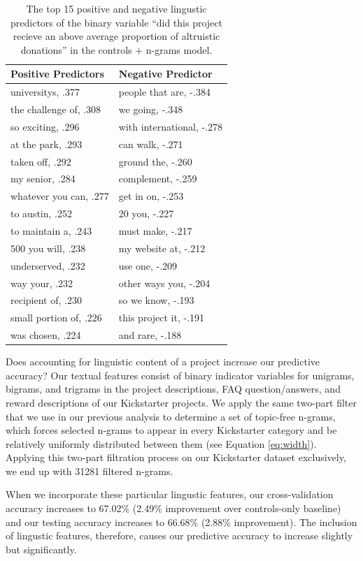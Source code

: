 \documentclass[letterpaper]{article}
\begin{document}
\begin{table}[t]
\centering
\begin{tabular}{|l|l|}
\hline
Positive Predictors & Negative Predictor \\
\hline
universitys, .377 & people that are, -.384 \\
the challenge of, .308 & we going, -.348\\
so exciting, .296 & with international, -.278\\
at the park, .293 & can walk, -.271\\
taken off, .292 & ground the, -.260\\
my senior, .284 & complement, -.259\\
whatever you can, .277 & get in on, -.253\\
to austin, .252 & 20 you, -.227\\
to maintain a, .243 & must make, -.217\\
500 you will, .238 & my website at, -.212\\
underserved, .232 & use one, -.209 \\
way your, .232 & other ways you, -.204\\
recipient of, .230 & so we know, -.193\\
small portion of, .226 & this project it, -.191\\
was chosen, .224 & and rare, -.188\\
\hline
\end{tabular}
\caption{The top 15 positive and negative lingustic predictors of the binary variable ``did this project recieve an above average proportion of altruistic donations'' in the controls + n-grams model.}
\label{tab:regression}
\end{table}

Does accounting for linguistic content of a project increase our predictive accuracy? Our textual features consist of binary indicator variables for unigrams, bigrams, and trigrams in the project descriptions, FAQ question/answers, and reward descriptions of our Kickstarter projects. We apply the same two-part filter that we use in our previous analysis to determine a set of topic-free n-grams, which forces selected n-grams to appear in every Kickstarter category and be relatively uniformly distributed between them (see Equation \ref{eq:width}). Applying this two-part filtration process on our Kickstarter dataset exclusively, we end up with 31281 filtered n-grams.

When we incorporate these particular lingustic features, our cross-validation accuracy increases to 67.02\% (2.49\% improvement over controls-only baseline) and our testing accuracy increases to 66.68\% (2.88\% improvement). The inclusion of lingustic features, therefore, causes our predictive accuracy to increase slightly but significantly.
\end{document}
